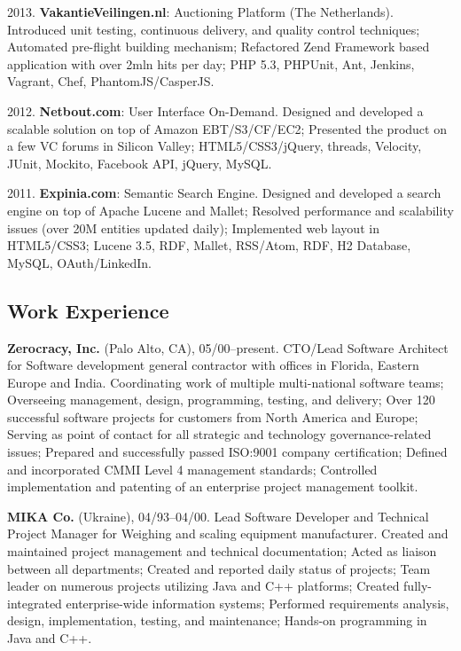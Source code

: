 \documentclass[12pt]{article}
\begin{document}
2013. \textbf{VakantieVeilingen.nl}: Auctioning Platform (The Netherlands).
Introduced unit testing, continuous delivery, and quality control techniques;
Automated pre-flight building mechanism;
Refactored Zend Framework based application with over 2mln hits per day;
PHP 5.3, PHPUnit, Ant, Jenkins, Vagrant, Chef, PhantomJS/CasperJS.

2012. \textbf{Netbout.com}: User Interface On-Demand.
Designed and developed a scalable solution on top of Amazon EBT/S3/CF/EC2;
Presented the product on a few VC forums in Silicon Valley;
HTML5/CSS3/jQuery, threads, Velocity, JUnit, Mockito, Facebook API, jQuery, MySQL.

2011. \textbf{Expinia.com}: Semantic Search Engine.
Designed and developed a search engine on top of Apache Lucene and Mallet;
Resolved performance and scalability issues (over 20M entities updated daily);
Implemented web layout in HTML5/CSS3;
Lucene 3.5, RDF, Mallet, RSS/Atom, RDF, H2 Database, MySQL, OAuth/LinkedIn.

\subsection*{Work Experience}

\textbf{Zerocracy, Inc.} (Palo Alto, CA), 05/00--present.
CTO/Lead Software Architect for Software development general contractor with offices in Florida, Eastern Europe and India.
Coordinating work of multiple multi-national software teams;
Overseeing management, design, programming, testing, and delivery;
Over 120 successful software projects for customers from North America and Europe;
Serving as point of contact for all strategic and technology governance-related issues;
Prepared and successfully passed ISO:9001 company certification;
Defined and incorporated CMMI Level 4 management standards;
Controlled implementation and patenting of an enterprise project management toolkit.

\textbf{MIKA Co.} (Ukraine), 04/93--04/00.
Lead Software Developer and Technical Project Manager for Weighing and scaling equipment manufacturer.
Created and maintained project management and technical documentation;
Acted as liaison between all departments;
Created and reported daily status of projects;
Team leader on numerous projects utilizing Java and C++ platforms;
Created fully-integrated enterprise-wide information systems;
Performed requirements analysis, design, implementation, testing, and maintenance;
Hands-on programming in Java and C++.
\end{document}
